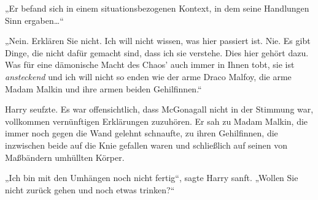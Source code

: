 „Er befand sich in einem situationsbezogenen Kontext, in dem seine Handlungen Sinn ergaben…“

„Nein. Erklären Sie nicht. Ich will nicht wissen, was hier passiert ist. Nie. Es gibt Dinge, die nicht dafür gemacht sind, dass ich sie verstehe. Dies hier gehört dazu. Was für eine dämonische Macht des Chaos' auch immer in Ihnen tobt, sie ist \emph{ansteckend} und ich will nicht so enden wie der arme Draco Malfoy, die arme Madam Malkin und ihre armen beiden Gehilfinnen.“

Harry seufzte. Es war offensichtlich, dass McGonagall nicht in der Stimmung war, vollkommen vernünftigen Erklärungen zuzuhören. Er sah zu Madam Malkin, die immer noch gegen die Wand gelehnt schnaufte, zu ihren Gehilfinnen, die inzwischen beide auf die Knie gefallen waren und schließlich auf seinen von Maßbändern umhüllten Körper.

„Ich bin mit den Umhängen noch nicht fertig“, sagte Harry sanft. „Wollen Sie nicht zurück gehen und noch etwas trinken?“

